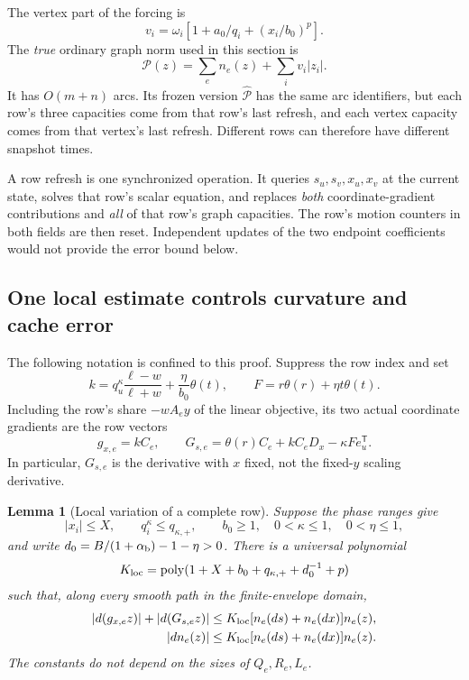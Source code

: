 \documentclass[11pt]{article}
\newtheorem{lemma}[theorem]{Lemma}
\theoremstyle{definition}\newtheorem{definition}[theorem]{Definition}
\theoremstyle{remark}\newtheorem{remark}[theorem]{Remark}
\begin{document}
The vertex part of the forcing is
\[
 v_i=\omega_i\left[1+a_0/q_i+(x_i/b_0)^p\right].
\]
The \emph{true} ordinary graph norm used in this section is
\begin{equation}
 \mathcal P(z)=\sum_e n_e(z)+\sum_i v_i|z_i|.
 \label{maint:trueproxy}
\end{equation}
It has $O(m+n)$ arcs. Its frozen version
$\widehat{\mathcal P}$ has the same arc identifiers, but each row's
three capacities come from that row's last refresh, and each vertex
capacity comes from that vertex's last refresh. Different rows can
therefore have different snapshot times.

A row refresh is one synchronized operation. It queries
$s_u,s_v,x_u,x_v$ at the current state, solves that row's scalar
equation, and replaces \emph{both} coordinate-gradient contributions
and \emph{all} of that row's graph capacities. The row's motion
counters in both fields are then reset. Independent updates of the two
endpoint coefficients would not provide the error bound below.

\subsection{One local estimate controls curvature and cache error}

The following notation is confined to this proof. Suppress the row
index and set
\[
 k=q_u^\kappa\frac{\ell-w}{\ell+w}
       +\frac{\eta}{b_0}\theta(t),\qquad
 F=r\theta(r)+\eta t\theta(t).
\]
Including the row's share $-wA_ey$ of the linear objective, its two
actual coordinate gradients are the row vectors
\begin{equation}
 g_{x,e}=kC_e,\qquad
 G_{s,e}=\theta(r)C_e+kC_eD_x-\kappa F e_u^{\mathsf T}.
 \label{maint:rowgradients}
\end{equation}
In particular, $G_{s,e}$ is the derivative with $x$ fixed, not the
fixed-$y$ scaling derivative.

\begin{lemma}[Local variation of a complete row]
\label{maint:local}
Suppose the phase ranges give
\[
 |x_i|\leq X,\qquad q_i^\kappa\leq q_{\kappa,+},\qquad
 b_0\geq1,\quad 0<\kappa\leq1,\quad 0<\eta\leq1,
\]
and write
$d_0=B/(1+\alpha_{\rm b})-1-\eta>0$.
There is a universal polynomial
\[
 K_{\rm loc}=
 \operatorname{poly}(1+X+b_0+q_{\kappa,+}+d_0^{-1}+p)
\]
such that, along every smooth path in the finite-envelope domain,
\begin{align}
 |d(g_{x,e}z)|+|d(G_{s,e}z)|
   &\leq K_{\rm loc}
          [n_e(ds)+n_e(dx)]n_e(z),
             \label{maint:rowlipschitz}\\
 |dn_e(z)|
   &\leq K_{\rm loc}
          [n_e(ds)+n_e(dx)]n_e(z).
             \label{maint:normlipschitz}
\end{align}
The constants do not depend on the sizes of $Q_e,R_e,L_e$.
\end{lemma}
\end{document}
